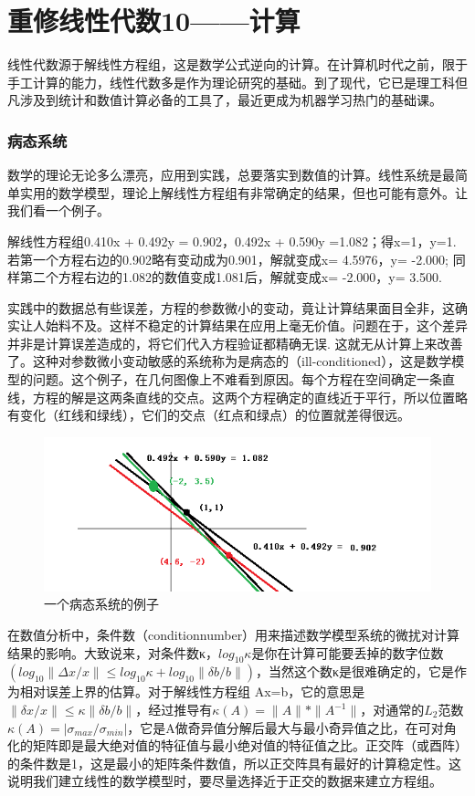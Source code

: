\chapter{重修线性代数10——计算}

线性代数源于解线性方程组，这是数学公式逆向的计算。在计算机时代之前，限于手工计算的能力，线性代数多是作为理论研究的基础。到了现代，它已是理工科但凡涉及到统计和数值计算必备的工具了，最近更成为机器学习热门的基础课。

\subsection{病态系统}

数学的理论无论多么漂亮，应用到实践，总要落实到数值的计算。线性系统是最简单实用的数学模型，理论上解线性方程组有非常确定的结果，但也可能有意外。让我们看一个例子。

\kaishu

解线性方程组0.410x + 0.492y = 0.902，0.492x + 0.590y =1.082；得x=1，y=1. 若第一个方程右边的0.902略有变动成为0.901，解就变成x= 4.5976，y= -2.000; 同样第二个方程右边的1.082的数值变成1.081后，解就变成x= -2.000，y= 3.500.

\songti

实践中的数据总有些误差，方程的参数微小的变动，竟让计算结果面目全非，这确实让人始料不及。这样不稳定的计算结果在应用上毫无价值。问题在于，这个差异并非是计算误差造成的，将它们代入方程验证都精确无误. 这就无从计算上来改善了。这种对参数微小变动敏感的系统称为是病态的（ill-conditioned），这是数学模型的问题。这个例子，在几何图像上不难看到原因。每个方程在空间确定一条直线，方程的解是这两条直线的交点。这两个方程确定的直线近于平行，所以位置略有变化（红线和绿线），它们的交点（红点和绿点）的位置就差得很远。

\begin{figure}[h]
	\centering
	\includegraphics[width=0.7\linewidth]{pic/1612386nrnueyrye6k8kq4.png}
	\caption{一个病态系统的例子}
	\label{fig:1612386nrnueyrye6k8kq4}
\end{figure}

在数值分析中，条件数（conditionnumber）用来描述数学模型系统的微扰对计算结果的影响。大致说来，对条件数κ，$ log_{10}κ $是你在计算可能要丢掉的数字位数$ (log_{10}\|Δx/x\|\leq log_{10}κ+ log_{10}\|\delta b/b\|) $，当然这个数κ是很难确定的，它是作为相对误差上界的估算。对于解线性方程组 Ax=b，它的意思是$ \|\delta x/x\| \leq κ\|\delta b/b\| $，经过推导有$ κ(A) =\|A\|*\|A^{-1}\| $，对通常的$ L_{2} $范数$ κ(A)= |\sigma_{max} /\sigma_{min}| $，它是A做奇异值分解后最大与最小奇异值之比，在可对角化的矩阵即是最大绝对值的特征值与最小绝对值的特征值之比。正交阵（或酉阵）的条件数是1，这是最小的矩阵条件数值，所以正交阵具有最好的计算稳定性。这说明我们建立线性的数学模型时，要尽量选择近于正交的数据来建立方程组。

